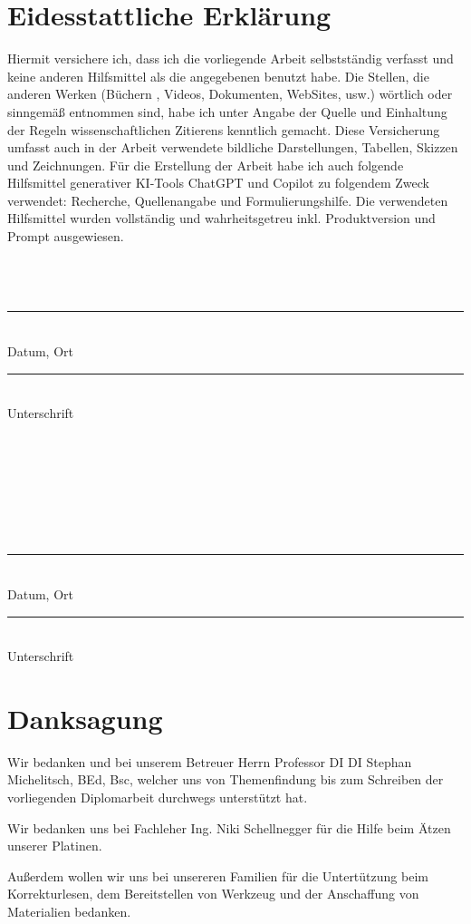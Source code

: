 \chapter*{Eidesstattliche Erklärung}

Hiermit versichere ich, dass ich die vorliegende Arbeit selbstständig verfasst und keine anderen Hilfsmittel als die angegebenen benutzt habe.
Die Stellen, die anderen Werken (Büchern , Videos, Dokumenten, WebSites, usw.) wörtlich oder sinngemäß entnommen sind, habe ich unter Angabe der Quelle und Einhaltung der Regeln wissenschaftlichen Zitierens kenntlich gemacht.
Diese Versicherung umfasst auch in der Arbeit verwendete bildliche Darstellungen, Tabellen, Skizzen und Zeichnungen. Für die Erstellung der Arbeit habe ich auch folgende Hilfsmittel generativer KI-Tools ChatGPT und Copilot 
zu folgendem Zweck verwendet: Recherche, Quellenangabe und Formulierungshilfe.
Die verwendeten Hilfsmittel wurden vollständig und wahrheitsgetreu inkl. Produktversion und Prompt ausgewiesen.\\\\
\\\\

\noindent
\begin{minipage}[t]{0.45\textwidth}
\rule{\textwidth}{0.4pt}\\
Datum, Ort
\end{minipage}
\hfill
\begin{minipage}[t]{0.45\textwidth}
\rule{\textwidth}{0.4pt}\\
Unterschrift
\end{minipage}
\\\\
\\\\
\\\\
\begin{minipage}[t]{0.45\textwidth}
\rule{\textwidth}{0.4pt}\\
Datum, Ort
\end{minipage}
\hfill
\begin{minipage}[t]{0.45\textwidth}
\rule{\textwidth}{0.4pt}\\
Unterschrift
\end{minipage}

\newpage

\chapter*{Danksagung}
Wir bedanken und bei unserem Betreuer Herrn Professor DI DI Stephan Michelitsch, BEd, Bsc, welcher 
uns von Themenfindung bis zum Schreiben der vorliegenden Diplomarbeit durchwegs unterstützt hat.

\noindent
Wir bedanken uns bei Fachleher Ing. Niki Schellnegger für die Hilfe beim Ätzen unserer Platinen.

\noindent
Außerdem wollen wir uns bei unsereren Familien für die Untertützung beim Korrekturlesen, dem Bereitstellen 
von Werkzeug und der Anschaffung von Materialien bedanken.  


\newpage

